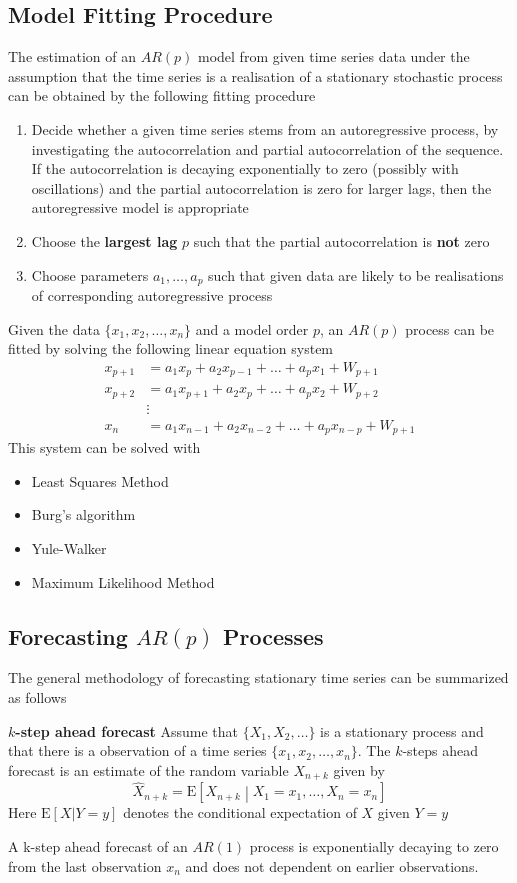 \documentclass[11pt]{article}
\theoremstyle{definition}
\newcommand*\ev[1]{\mathrel{\text{E}\left[#1\right]}}
\begin{document}
\subsection{Model Fitting Procedure}
The estimation of an $AR(p)$ model from given time series data under the assumption that the time series is a realisation of a stationary stochastic process can be obtained by the following fitting procedure
\begin{enumerate}
	\item Decide whether a given time series stems from an autoregressive process, by investigating the autocorrelation and partial autocorrelation of the sequence. If the autocorrelation is decaying exponentially to zero (possibly with oscillations) and the partial autocorrelation is zero for larger lags, then the autoregressive model is appropriate
	\item Choose the \textbf{largest lag} $p$ such that the partial autocorrelation is \textbf{not} zero
	\item Choose parameters $a_1,\dots,a_p$ such that given data are likely to be realisations of corresponding autoregressive process
\end{enumerate}
Given the data $\{x_1,x_2,\dots,x_n\}$ and a model order $p$, an $AR(p)$ process can be fitted by solving the following linear equation system
\begin{align*}
	x_{p+1} &= a_1 x_p + a_2 x_{p-1} + \dots + a_p x_1 + W_{p+1}\\
	x_{p+2} &= a_1 x_{p+1} + a_2 x_{p} + \dots + a_p x_2 + W_{p+2}\\
	&\vdots \\
	x_n &= a_1 x_{n-1} + a_2 x_{n-2} + \dots + a_p x_{n-p} + W_{p+1}
\end{align*}
This system can be solved with
\begin{itemize}
	\item Least Squares Method
	\item Burg's algorithm
	\item Yule-Walker
	\item Maximum Likelihood Method
\end{itemize}

\subsection{Forecasting $AR(p)$ Processes}
The general methodology of forecasting stationary time series can be summarized as follows
\begin{definition}
	\textbf{$k$-step ahead forecast}
	Assume that $\{X_1,X_2,\dots\}$ is a stationary process and that there is a observation of a time series $\{x_1,x_2,\dots,x_n\}$. The $k$-steps ahead forecast is an estimate of the random variable $X_{n+k}$ given by
	\begin{equation*}
		\hat{X}_{n+k} = \ev{X_{n+k}\middle| X_1=x_1,\dots, X_n = x_n}
	\end{equation*}
	Here $\ev{X|Y=y}$ denotes the  conditional expectation of $X$ given $Y = y$
\end{definition}
A k-step ahead forecast of an $AR(1)$ process is exponentially decaying to zero from the last observation $x_n$ and does not dependent on earlier observations.
\end{document}
